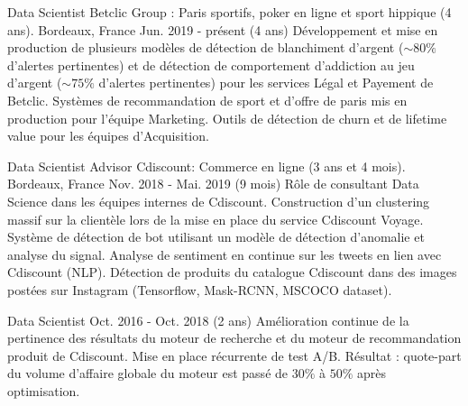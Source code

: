 
\begin{cventries}

  \cventry
    {Data Scientist} %
    {Betclic Group : Paris sportifs, poker en ligne et sport hippique (4 ans).} %
    {Bordeaux, France} %
    {Jun. 2019 - présent (4 ans)} %
    {
    Développement et mise en production de plusieurs modèles de détection de blanchiment d'argent ($\sim80\%$ d'alertes pertinentes) et de détection de comportement d'addiction au jeu d'argent ($\sim75\%$ d'alertes pertinentes) pour les services Légal et Payement de Betclic.\newline
    Systèmes de recommandation de sport et d'offre de paris mis en production pour l'équipe Marketing.\newline 
    Outils de détection de churn et de lifetime value pour les équipes d'Acquisition.
    }

  \cventry
    {Data Scientist Advisor} %
    {Cdiscount: Commerce en ligne (3 ans et 4 mois).} %
    {Bordeaux, France} %
    {Nov. 2018 - Mai. 2019 (9 mois)} %
    {
    Rôle de consultant Data Science dans les équipes internes de Cdiscount. Construction d'un clustering massif sur la clientèle lors de la mise en place du service Cdiscount Voyage.\newline
    Système de détection de bot utilisant un modèle de détection d'anomalie et analyse du signal.\newline
    Analyse de sentiment en continue sur les tweets en lien avec Cdiscount (NLP).\newline
    Détection de produits du catalogue Cdiscount dans des images postées sur Instagram (Tensorflow, Mask-RCNN, MSCOCO dataset).
    }

  \cventry
    {Data Scientist} %
    {} %
    {} %
    {Oct. 2016 - Oct. 2018 (2 ans)} %
    {
    Amélioration continue de la pertinence des résultats du moteur de recherche et du moteur de  recommandation produit de Cdiscount.\newline
    Mise en place récurrente de test A/B.\newline 
    Résultat : quote-part du volume d'affaire globale du moteur est passé de $30\%$ à $50\%$ après optimisation.
    }


\end{cventries}
